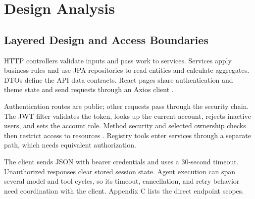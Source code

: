\chapter{Design Analysis}
\section{Layered Design and Access Boundaries}
HTTP controllers validate inputs and pass work to services. Services apply business rules and use JPA repositories to read entities and calculate aggregates. DTOs define the API data contracts. React pages share authentication and theme state and send requests through an Axios client \cite{repo}.

Authentication routes are public; other requests pass through the security chain. The JWT filter validates the token, looks up the current account, rejects inactive users, and sets the account role. Method security and selected ownership checks then restrict access to resources \cite{spring}. Registry tools enter services through a separate path, which needs equivalent authorization.

The client sends JSON with bearer credentials and uses a 30-second timeout. Unauthorized responses clear stored session state. Agent execution can span several model and tool cycles, so its timeout, cancellation, and retry behavior need coordination with the client. Appendix C lists the direct endpoint scopes.


